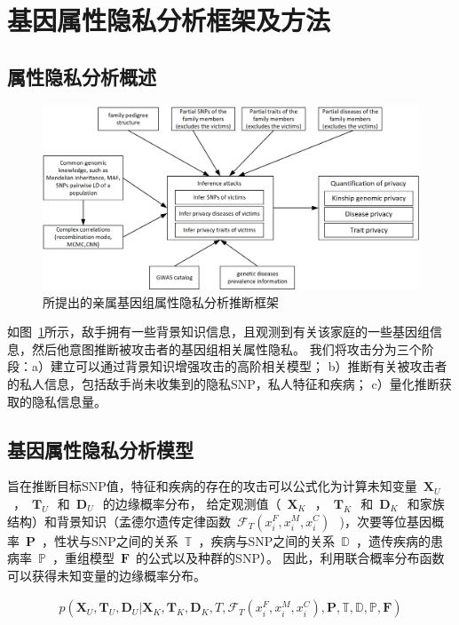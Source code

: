 \section{基因属性隐私分析框架及方法}
\label{sec:inference-attack}

\subsection{属性隐私分析概述}

\begin{figure}[htbp]
	\centering
	\includegraphics[width=0.95\linewidth]{./figures/attack-framework.png}
	\centering
	\caption{所提出的亲属基因组属性隐私分析推断框架}\label{fig:attack-framework}
\end{figure}

如图~\ref{fig:attack-framework}所示，敌手拥有一些背景知识信息，且观测到有关该家庭的一些基因组信息，然后他意图推断被攻击者的基因组相关属性隐私。 我们将攻击分为三个阶段：a）建立可以通过背景知识增强攻击的高阶相关模型； b）推断有关被攻击者的私人信息，包括敌手尚未收集到的隐私SNP，私人特征和疾病； c）量化推断获取的隐私信息量。

\subsection{基因属性隐私分析模型}
旨在推断目标SNP值，特征和疾病的存在的攻击可以公式化为计算未知变量~$\mathbf{X}_U~$~，~$\mathbf{T}_U~$~和~$\mathbf{D}_U~$~的边缘概率分布，
给定观测值（~$\mathbf{X}_K~$~，~$\mathbf{T}_K~$~和~$\mathbf{D}_K~$~和家族结构）和背景知识（孟德尔遗传定律函数~$\mathcal{F}_T(x_i^F,x_i^M,x_i^C)~$~)，次要等位基因概率~$\mathbf{P}$~，性状与SNP之间的关系~$\mathbb{T}$~，疾病与SNP之间的关系~$\mathbb{D}$~，遗传疾病的患病率~$\mathbb{P}$~，重组模型~$\mathbf{F}$~的公式以及种群的SNP）。 因此，利用联合概率分布函数可以获得未知变量的边缘概率分布。

\begin{equation}\label{eq:joint-pro}
\begin{aligned}
p(\mathbf{X}_U, \mathbf{T}_U, \mathbf{D}_U | \mathbf{X}_K, \mathbf{T}_K, \mathbf{D}_K, T, \mathcal{F}_T(x_i^F,x_i^M,x_i^C), \mathbf{P}, \mathbb{T}, \mathbb{D}, \mathbb{P}, \mathbf{F})
\end{aligned}
\end{equation}


